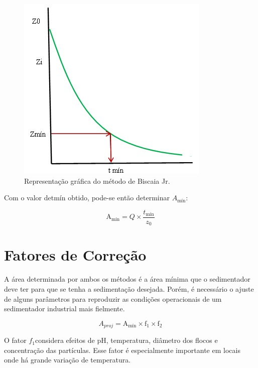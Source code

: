 \begin{figure}[H]
	\begin{center}
		\includegraphics[scale=.5,trim={0 0 0 0}]{figuras/ladeq/sedi/graphBiscaia}
		\caption{Representação gráfica do método de Biscaia Jr.}
		\label{tabqua1}
	\end{center}
\end{figure}


Com o valor detmín obtido, pode-se então determinar $ A_{\text{mín}} $:

\begin{equation}\label{key}
\operatorname{A_{\text{mín}}}=Q \times \frac{t_{\text{mín}}}{z_{0}}
\end{equation}


\section{Fatores de Correção}

A área determinada por ambos os métodos é a área mínima que o sedimentador deve ter para que se tenha a sedimentação desejada. Porém, é necessário o ajuste de alguns parâmetros para reproduzir as condições operacionais de um sedimentador industrial mais fielmente.


\begin{equation}\label{key}
A_{proj}=\operatorname{A_{\text{mín}}} \times \mathrm{f}_{1} \times \mathrm{f}_{2}
\end{equation}

O fator $ f_{1}  $considera efeitos de pH, temperatura, diâmetro dos flocos e concentração das partículas. Esse fator é especialmente importante em locais onde há grande variação de temperatura.


